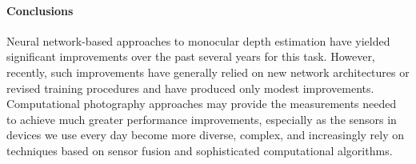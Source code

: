 \paragraph{Conclusions}
Neural network-based approaches to monocular depth estimation have yielded
significant improvements over the past several years for this task. However,
recently, such improvements have generally relied on new network architectures or
revised training procedures and have produced only modest improvements. Computational
photography approaches may provide the measurements needed to achieve much greater
performance improvements, especially as the sensors in devices we use every day
become more diverse, complex, and increasingly rely on techniques based on
sensor fusion and sophisticated computational algorithms.
 
